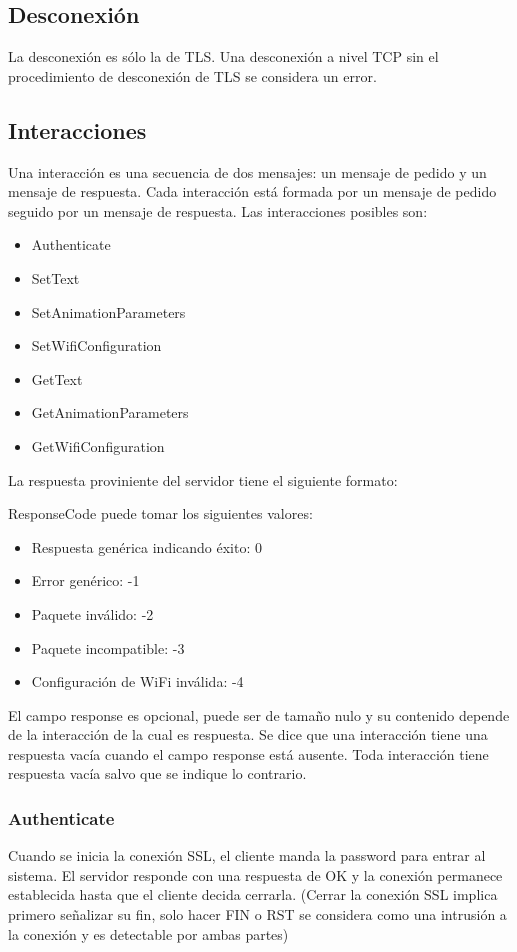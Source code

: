 \subsection{Desconexión}
La desconexión es sólo la de TLS. Una desconexión a nivel TCP sin el procedimiento de desconexión de TLS se considera un error.

\subsection{Interacciones}
Una interacción es una secuencia de dos mensajes: un mensaje de pedido y un mensaje de respuesta. Cada interacción está formada por un mensaje de pedido seguido por un mensaje de respuesta.
Las interacciones posibles son:
\begin{itemize}
	\item Authenticate
	\item SetText
	\item SetAnimationParameters
	\item SetWifiConfiguration
	\item GetText
	\item GetAnimationParameters
	\item GetWifiConfiguration
\end{itemize}

La respuesta proviniente del servidor tiene el siguiente formato:


ResponseCode puede tomar los siguientes valores:
\begin{itemize}
	\item Respuesta genérica indicando éxito: 0
	\item Error genérico: -1
	\item Paquete inválido: -2
	\item Paquete incompatible: -3
	\item Configuración de WiFi inválida: -4
\end{itemize}

El campo response es opcional, puede ser de tamaño nulo y su contenido depende de la interacción de la cual es respuesta. Se dice que una interacción tiene una respuesta vacía cuando el campo response está ausente. Toda interacción tiene respuesta vacía salvo que se indique lo contrario.

\subsubsection{Authenticate}
Cuando se inicia la conexión SSL, el cliente manda la password para entrar al sistema. El servidor responde con una respuesta de OK y la conexión permanece establecida hasta que el cliente decida cerrarla. (Cerrar la conexión SSL implica primero señalizar su fin, solo hacer FIN o RST se considera como una intrusión a la conexión y es detectable por ambas partes)

